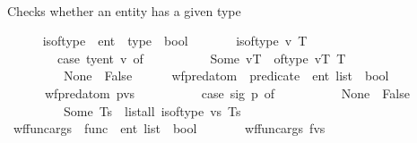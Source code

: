 \begin{isabellebody}
\isanewline
\ \ %
\begin{isamarkuptext}%
Checks whether an entity has a given type%
\end{isamarkuptext}\isamarkuptrue%
\ \ \ \ \isamarkupfalse%
\ is{\isacharunderscore}{\kern0pt}of{\isacharunderscore}{\kern0pt}type\ {\isacharcolon}{\kern0pt}{\isacharcolon}{\kern0pt}\ {\isachardoublequoteopen}{\isacharprime}{\kern0pt}ent\ {\isasymRightarrow}\ type\ {\isasymRightarrow}\ bool{\isachardoublequoteclose}\ \isanewline
\ \ \ \ \ \ {\isachardoublequoteopen}is{\isacharunderscore}{\kern0pt}of{\isacharunderscore}{\kern0pt}type\ v\ T\ {\isasymlongleftrightarrow}\ {\isacharparenleft}{\kern0pt}\isanewline
\ \ \ \ \ \ \ \ case\ ty{\isacharunderscore}{\kern0pt}ent\ v\ of\isanewline
\ \ \ \ \ \ \ \ \ \ Some\ vT\ {\isasymRightarrow}\ of{\isacharunderscore}{\kern0pt}type\ vT\ T\isanewline
\ \ \ \ \ \ \ \ {\isacharbar}{\kern0pt}\ None\ {\isasymRightarrow}\ False{\isacharparenright}{\kern0pt}{\isachardoublequoteclose}\isanewline
\isanewline
\ \ \ \ \isamarkupfalse%
\ wf{\isacharunderscore}{\kern0pt}pred{\isacharunderscore}{\kern0pt}atom\ {\isacharcolon}{\kern0pt}{\isacharcolon}{\kern0pt}\ {\isachardoublequoteopen}predicate\ {\isasymtimes}\ {\isacharprime}{\kern0pt}ent\ list\ {\isasymRightarrow}\ bool{\isachardoublequoteclose}\ \isanewline
\ \ \ \ \ \ {\isachardoublequoteopen}wf{\isacharunderscore}{\kern0pt}pred{\isacharunderscore}{\kern0pt}atom\ {\isacharparenleft}{\kern0pt}p{\isacharcomma}{\kern0pt}vs{\isacharparenright}{\kern0pt}\ {\isasymlongleftrightarrow}\ {\isacharparenleft}{\kern0pt}\isanewline
\ \ \ \ \ \ \ \ case\ sig\ p\ of\isanewline
\ \ \ \ \ \ \ \ \ \ None\ {\isasymRightarrow}\ False\isanewline
\ \ \ \ \ \ \ \ {\isacharbar}{\kern0pt}\ Some\ Ts\ {\isasymRightarrow}\ list{\isacharunderscore}{\kern0pt}all{}\ is{\isacharunderscore}{\kern0pt}of{\isacharunderscore}{\kern0pt}type\ vs\ Ts{\isacharparenright}{\kern0pt}{\isachardoublequoteclose}\isanewline
\isanewline
\ \ \ \ \isamarkupfalse%
\ wf{\isacharunderscore}{\kern0pt}func{\isacharunderscore}{\kern0pt}args\ {\isacharcolon}{\kern0pt}{\isacharcolon}{\kern0pt}\ {\isachardoublequoteopen}func\ {\isasymtimes}\ {\isacharprime}{\kern0pt}ent\ list\ {\isasymRightarrow}\ bool{\isachardoublequoteclose}\ \isanewline
\ \ \ \ \ \ {\isachardoublequoteopen}wf{\isacharunderscore}{\kern0pt}func{\isacharunderscore}{\kern0pt}args\ {\isacharparenleft}{\kern0pt}f{\isacharcomma}{\kern0pt}vs{\isacharparenright}{\kern0pt}\ {\isasymlongleftrightarrow}\ {\isacharparenleft}{\kern0pt}\isanewline

\end{isabellebody}
